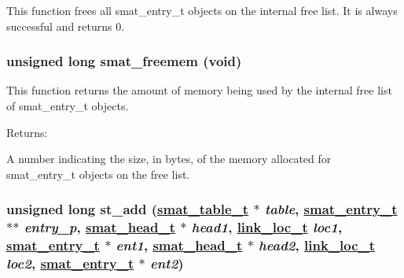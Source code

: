 This function frees all smat\_\-entry\_\-t objects on the internal free list. It is always successful and returns 0. \hypertarget{group__dbprim__smat_a8}{
\subsubsection[smat\_\-freemem]{\setlength{\rightskip}{0pt plus 5cm}unsigned long smat\_\-freemem (void)}}
\label{group__dbprim__smat_a8}


This function returns the amount of memory being used by the internal free list of smat\_\-entry\_\-t objects.

\begin{Desc}
\item[Returns: ]\par
A number indicating the size, in bytes, of the memory allocated for smat\_\-entry\_\-t objects on the free list. \end{Desc}
\hypertarget{group__dbprim__smat_a10}{
\subsubsection[st\_\-add]{\setlength{\rightskip}{0pt plus 5cm}unsigned long st\_\-add (\hyperlink{group__dbprim__smat_a0}{smat\_\-table\_\-t} $\ast$ {\em table}, \hyperlink{group__dbprim__smat_a2}{smat\_\-entry\_\-t} $\ast$$\ast$ {\em entry\_\-p}, \hyperlink{group__dbprim__smat_a1}{smat\_\-head\_\-t} $\ast$ {\em head1}, \hyperlink{group__dbprim__link_a4}{link\_\-loc\_\-t} {\em loc1}, \hyperlink{group__dbprim__smat_a2}{smat\_\-entry\_\-t} $\ast$ {\em ent1}, \hyperlink{group__dbprim__smat_a1}{smat\_\-head\_\-t} $\ast$ {\em head2}, \hyperlink{group__dbprim__link_a4}{link\_\-loc\_\-t} {\em loc2}, \hyperlink{group__dbprim__smat_a2}{smat\_\-entry\_\-t} $\ast$ {\em ent2})}}
\label{group__dbprim__smat_a10}


